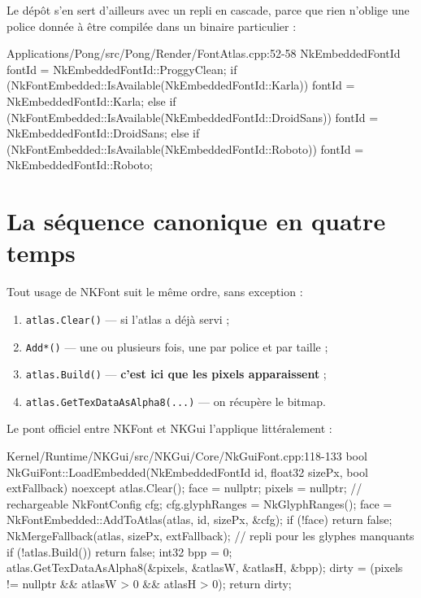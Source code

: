 Le dépôt s'en sert d'ailleurs avec un repli en cascade, parce que rien n'oblige
une police donnée à être compilée dans un binaire particulier :

\begin{nkcode}{Applications/Pong/src/Pong/Render/FontAtlas.cpp:52-58}
            NkEmbeddedFontId fontId = NkEmbeddedFontId::ProggyClean;
            if (NkFontEmbedded::IsAvailable(NkEmbeddedFontId::Karla)) {
                fontId = NkEmbeddedFontId::Karla;
            } else if (NkFontEmbedded::IsAvailable(NkEmbeddedFontId::DroidSans)) {
                fontId = NkEmbeddedFontId::DroidSans;
            } else if (NkFontEmbedded::IsAvailable(NkEmbeddedFontId::Roboto)) {
                fontId = NkEmbeddedFontId::Roboto;
            }
\end{nkcode}

\section{La séquence canonique en quatre temps}

Tout usage de NKFont suit le même ordre, sans exception :

\begin{enumerate}
  \item \texttt{atlas.Clear()} — si l'atlas a déjà servi ;
  \item \texttt{Add*()} — une ou plusieurs fois, une par police et par taille ;
  \item \texttt{atlas.Build()} — \textbf{c'est ici que les pixels apparaissent} ;
  \item \texttt{atlas.GetTexDataAsAlpha8(...)} — on récupère le bitmap.
\end{enumerate}

Le pont officiel entre NKFont et NKGui l'applique littéralement :

\begin{nkcode}{Kernel/Runtime/NKGui/src/NKGui/Core/NkGuiFont.cpp:118-133}
        bool NkGuiFont::LoadEmbedded(NkEmbeddedFontId id, float32 sizePx, bool extFallback) noexcept {
            atlas.Clear();
            face = nullptr;
            pixels = nullptr; // rechargeable
            NkFontConfig cfg;
            cfg.glyphRanges = NkGlyphRanges();
            face = NkFontEmbedded::AddToAtlas(atlas, id, sizePx, &cfg);
            if (!face)
                return false;
            NkMergeFallback(atlas, sizePx, extFallback); // repli pour les glyphes manquants
            if (!atlas.Build())
                return false;
            int32 bpp = 0;
            atlas.GetTexDataAsAlpha8(&pixels, &atlasW, &atlasH, &bpp);
            dirty = (pixels != nullptr && atlasW > 0 && atlasH > 0);
            return dirty;
        }
\end{nkcode}

